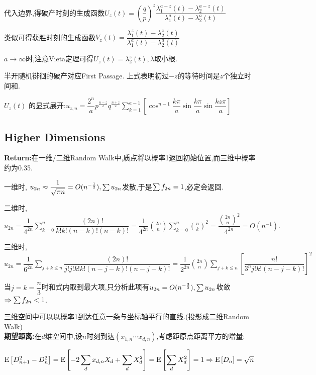   代入边界,得破产时刻的生成函数$ U_z(t) = (\dfrac{q}{p})^z\dfrac{\lambda_1^{a-z}(t) - \lambda_2^{a-z}(t)}{\lambda_1^a(t)-\lambda_2^a(t)}$

  类似可得获胜时刻的生成函数$ V_z(t) = \dfrac{\lambda_1^z(t)-\lambda_2^z(t)}{\lambda_1^a(t) - \lambda_2^a(t)}$

  $ a\to \infty$时,注意Vieta定理可得$ U_z(t) = \lambda_2^z(t),\lambda$取小根.

  半开随机徘徊的破产对应First Passage. 上式表明初过$ -z$的等待时间是$ z$个独立时间和.

  $ U_z(t)$  的显式展开:$ u_{z,n} =
  \dfrac{2^n}{a}p^{\frac{n-z}{2}}q^{\frac{n+z}{2}}\sum_{k=1}^{a-1}[\cos^{n-1}\dfrac{k\pi}{a}\sin\dfrac{k\pi}{a}\sin\dfrac{kz\pi}{a}]$

\subsection{Higher Dimensions}
\textbf{Return:}在一维/二维Random Walk中,质点将以概率1返回初始位置,而三维中概率约为0.35.

一维时, $ u_{2n}\approx \dfrac{1}{\sqrt{\pi n}} = O(n^{-\frac{1}{2}}), \Oldsum u_{2n}$发散,于是$ \Oldsum f_{2n} = 1$,必定会返回.

二维时, $ u_{2n} = \dfrac{1}{4^{2n}}\sum_{k=0}^n\dfrac{(2n)!}{k!k!(n-k)!(n-k)!} = \dfrac{1}{4^{2n}}{{2n}\choose{n}} \sum_{k=0}^n {n\choose{k}}^2 =
\dfrac{{{2n}\choose{n}}^2}{4^{2n}} = O(n^{-1}). $

三维时,$ u_{2n} = \dfrac{1}{6^{2n}}\sum_{j+k\le n}\dfrac{(2n)!}{j!j!k!k!(n-j-k)!(n-j-k)!} = \dfrac{1}{2^{2n}}{{2n}\choose{n}} \sum_{j+k\le n}[\dfrac{n!}{3^n
  j!k!(n-j-k)!}]^2$

当$j=k=\dfrac{n}{3} $时和式内取到最大项,只分析此项有$ u_{2n} = O(n^{-\frac{3}{2}}), \Oldsum u_{2n}$收敛$ \Rightarrow \Oldsum f_{2n}<1$.

三维空间中可以以概率1到达任意一条与坐标轴平行的直线.(投影成二维Random Walk)
\\

\textbf{期望距离:}在$ d$维空间中,设$ n$时刻到达$ (x_{1,n}\cdots x_{d,n})$,考虑距原点距离平方的增量:

$ \E{D_{n+1}^2 - D_{n}^2} = \E{-2\sum_d{x_{d,n}X_d} + \sum_d{X_d^2}} = \E{\sum_d{X_d^2}} = 1\Rightarrow \E{D_n}=\sqrt{n}$

